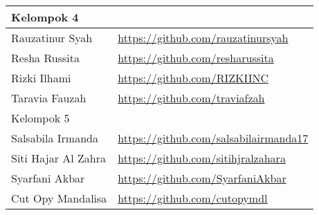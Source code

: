 \documentclass[a4paper]{tufte-handout}
\begin{document}
\begin{projects}
\begin{description}
\begin{table}[!ht]
\begin{tabular}{ll}
\midrule
Kelompok 4\\
\midrule
Rauzatinur Syah			& \url{https://github.com/rauzatinursyah} \\
Resha Russita			& \url{https://github.com/resharussita} \\
Rizki Ilhami			& \url{https://github.com/RIZKIINC} \\
Taravia Fauzah			& \url{https://github.com/traviafzah} \\
\midrule
Kelompok 5\\
\midrule
Salsabila Irmanda		& \url{https://github.com/salsabilairmanda17} \\
Siti Hajar Al Zahra		& \url{https://github.com/sitihjralzahara} \\
Syarfani Akbar			& \url{https://github.com/SyarfaniAkbar} \\
Cut Opy Mandalisa		& \url{https://github.com/cutopymdl} \\
\midrule
\end{tabular}
\end{table}
\end{description}
\end{projects}
\end{document}
